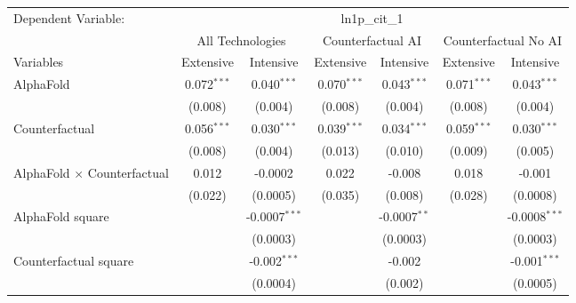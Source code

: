 \begingroup
\centering
\begin{tabular}{lcccccc}
   \tabularnewline \midrule \midrule
   Dependent Variable: & \multicolumn{6}{c}{ln1p\_cit\_1}\\
 & \multicolumn{2}{c}{All Technologies} & \multicolumn{2}{c}{Counterfactual AI} & \multicolumn{2}{c}{Counterfactual No AI} \\
\cmidrule(lr){1-1}\cmidrule(lr){2-3} \cmidrule(lr){4-5} \cmidrule(lr){6-7}
Variables & \multicolumn{1}{c}{Extensive} & \multicolumn{1}{c}{Intensive} & \multicolumn{1}{c}{Extensive} & \multicolumn{1}{c}{Intensive} & \multicolumn{1}{c}{Extensive} & \multicolumn{1}{c}{Intensive} \\
\cmidrule(lr){1-1}\cmidrule(lr){2-2} \cmidrule(lr){3-3} \cmidrule(lr){4-4} \cmidrule(lr){5-5} \cmidrule(lr){6-6} \cmidrule(lr){7-7}
   AlphaFold                          & 0.072$^{***}$ & 0.040$^{***}$     & 0.070$^{***}$ & 0.043$^{***}$  & 0.071$^{***}$ & 0.043$^{***}$\\   
                                      & (0.008)       & (0.004)           & (0.008)       & (0.004)        & (0.008)       & (0.004)\\   
   Counterfactual                     & 0.056$^{***}$ & 0.030$^{***}$     & 0.039$^{***}$ & 0.034$^{***}$  & 0.059$^{***}$ & 0.030$^{***}$\\   
                                      & (0.008)       & (0.004)           & (0.013)       & (0.010)        & (0.009)       & (0.005)\\   
   AlphaFold $\times$ Counterfactual  & 0.012         & -0.0002           & 0.022         & -0.008         & 0.018         & -0.001\\   
                                      & (0.022)       & (0.0005)          & (0.035)       & (0.008)        & (0.028)       & (0.0008)\\   
   AlphaFold square                   &               & -0.0007$^{***}$   &               & -0.0007$^{**}$ &               & -0.0008$^{***}$\\   
                                      &               & (0.0003)          &               & (0.0003)       &               & (0.0003)\\   
   Counterfactual square              &               & -0.002$^{***}$    &               & -0.002         &               & -0.001$^{***}$\\   
                                      &               & (0.0004)          &               & (0.002)        &               & (0.0005)\\   

\end{tabular}
